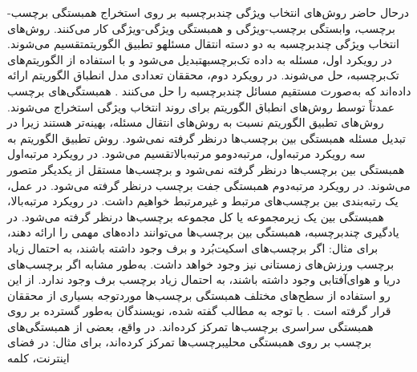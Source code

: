 درحال حاضر روش‌های انتخاب ویژگی چندبرچسبه بر روی استخراج همبستگی برچسب-برچسب، وابستگی برچسب-ویژگی و همبستگی ویژگی-ویژگی کار می‌کنند. روش‌های انتخاب ویژگی چندبرچسبه به دو دسته انتقال مسئلهو تطبیق الگوریتمتقسیم می‌شوند\cite{6471714}. در رویکرد اول، مسئله به داده تک‌برچسبهتبدیل می‌شود و با استفاده از الگوریتم‌های تک‌برچسبه، حل می‌شوند. در رویکرد دوم، محققان تعدادی مدل انطباق الگوریتم ارائه داده‌اند که به‌صورت مستقیم مسائل چندبرچسبه را حل می‌کنند \cite{zhang2022non,jian2016multi}. همبستگی‌های برچسب عمدتاً توسط روش‌های انطباق الگوریتم برای روند انتخاب ویژگی استخراج می‌شوند. 
روش‌های تطبیق الگوریتم نسبت به روش‌های انتقال مسئله، بهینه‌تر هستند زیرا در تبدیل مسئله همبستگی بین برچسب‌ها در‌نظر گرفته‌ نمی‌شود. روش تطبیق الگوریتم به سه رویکرد مرتبه‌اول، مرتبه‌دومو مرتبه‌بالاتقسیم می‌شود. در رویکرد مرتبه‌اول همبستگی بین برچسب‌ها درنظر گرفته نمی‌شود و برچسب‌ها مستقل از یکدیگر متصور می‌شوند. در رویکرد مرتبه‌دوم همبستگی جفت برچسب درنظر گرفته می‌شود. در عمل، یک رتبه‌بندی بین برچسب‌های مرتبط و غیرمرتبط خواهیم داشت. در رویکرد مرتبه‌بالا، همبستگی بین یک زیرمجموعه یا کل مجموعه برچسب‌ها درنظر گرفته می‌شود. در یادگیری چندبرچسبه، همبستگی بین برچسب‌ها می‌توانند داده‌های مهمی را ارائه دهند، برای مثال: اگر برچسب‌های اسکیت‌بُرد و برف وجود داشته باشند، به احتمال زیاد برچسب ورزش‌های زمستانی نیز وجود خواهد داشت. به‌طور مشابه اگر برچسب‌های دریا و هوای‌آفتابی وجود داشته باشند، به احتمال زیاد برچسب برف وجود ندارد. از این رو استفاده از سطح‌های مختلف همبستگی برچسب‌ها موردتوجه بسیاری از محققان قرار گرفته است \cite{zhou2018brief}. با توجه به مطالب گفته شده، نویسندگان \cite{furnkranz2008multilabel,ji2008extracting,read2011classifier} به‌طور گسترده بر روی همبستگی  سراسری برچسب‌ها تمرکز کرده‌اند. در واقع، بعضی از همبستگی‌های برچسب \cite{huang2012multi,weng2018multi} بر روی همبستگی محلیبرچسب‌ها تمرکز کرده‌اند، برای مثال: در فضای اینترنت، کلمه 

